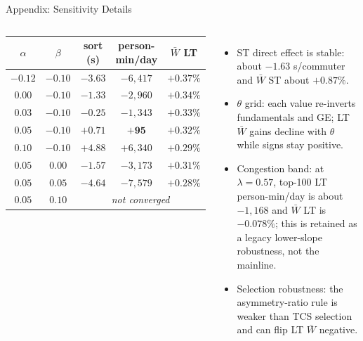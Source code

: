 \documentclass[11pt,aspectratio=169]{beamer}
\newcommand{\app}[1]{\allowbreak\hspace{0.25em}\hyperlink{#1}{\beamergotobutton{details}}}
\newcommand{\navback}[1]{\par\vspace{0.35em}\noindent\hfill\hyperlink{#1}{\beamerreturnbutton{back}}}
\begin{document}
\begin{frame}[label=appsensdetail]{Appendix: Sensitivity Details}
\scriptsize
\begin{columns}[T,onlytextwidth]
\begin{flushright}
\setlength{\tabcolsep}{3.5pt}
\begin{tabular}{ccccc}
\toprule
$\alpha$ & $\beta$ & sort (s) & person-min/day & $\bar W$ LT \\
\midrule
$-0.12$ & $-0.10$ & $-3.63$ & $-6{,}417$ & $+0.37\%$ \\
$0.00$ & $-0.10$ & $-1.33$ & $-2{,}960$ & $+0.34\%$ \\
$0.03$ & $-0.10$ & $-0.25$ & $-1{,}343$ & $+0.33\%$ \\
$\mathbf{0.05}$ & $\mathbf{-0.10}$ & $\mathbf{+0.71}$ & $\mathbf{+95}$ & $\mathbf{+0.32\%}$ \\
$0.10$ & $-0.10$ & $+4.88$ & $+6{,}340$ & $+0.29\%$ \\
$0.05$ & $0.00$ & $-1.57$ & $-3{,}173$ & $+0.31\%$ \\
$0.05$ & $0.05$ & $-4.64$ & $-7{,}579$ & $+0.28\%$ \\
$0.05$ & $0.10$ & \multicolumn{3}{c}{\emph{not converged}} \\
\bottomrule
\end{tabular}
\end{flushright}
\begin{itemize}\footnotesize
  \item ST direct effect is stable: about $-1.63$ s/commuter and $\bar W$ ST about $+0.87\%$.
  \item $\theta$ grid: each value re-inverts fundamentals and GE; LT $\bar W$ gains decline with $\theta$ while signs stay positive. \app{appsens_theta}
  \item Congestion band: at $\lambda=0.57$, top-100 LT person-min/day is about $-1{,}168$ and $\bar W$ LT is $-0.078\%$; this is retained as a legacy lower-slope robustness, not the mainline.
  \item Selection robustness: the asymmetry-ratio rule is weaker than TCS selection and can flip LT $\bar W$ negative.
\end{itemize}
\end{columns}
\navback{appsens}
\end{frame}
\end{document}
